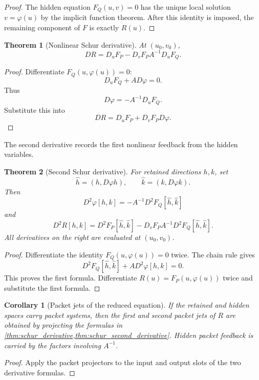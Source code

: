 \documentclass[11pt,a4paper]{article}
\newtheorem{theorem}{Theorem}[section]
\theoremstyle{plain}
\newtheorem{corollary}[corollary]{Corollary}
\theoremstyle{definition}
\theoremstyle{remark}
\begin{document}
\begin{proof}
The hidden equation $F_Q(u,v)=0$ has the unique local solution $v=\varphi(u)$ by the implicit function theorem.  After this identity is imposed, the remaining component of $F$ is exactly $R(u)$.
\end{proof}

\begin{theorem}[Nonlinear Schur derivative]\label{thm:schur_derivative}
At $(u_0,v_0)$,
\[
DR
=
D_uF_P
-
D_vF_P A^{-1}D_uF_Q.
\]
\end{theorem}

\begin{proof}
Differentiate $F_Q(u,\varphi(u))=0$:
\[
D_uF_Q+A D\varphi=0.
\]
Thus
\[
D\varphi=-A^{-1}D_uF_Q.
\]
Substitute this into
\[
DR=D_uF_P+D_vF_PD\varphi.
\]
\end{proof}

The second derivative records the first nonlinear feedback from the hidden variables.

\begin{theorem}[Second Schur derivative]\label{thm:schur_second_derivative}
For retained directions $h,k$, set
\[
\widehat h=(h,D\varphi h),
\qquad
\widehat k=(k,D\varphi k).
\]
Then
\[
D^2\varphi[h,k]
=
-A^{-1}D^2F_Q[\widehat h,\widehat k]
\]
and
\[
D^2R[h,k]
=
D^2F_P[\widehat h,\widehat k]
-
D_vF_P A^{-1}D^2F_Q[\widehat h,\widehat k].
\]
All derivatives on the right are evaluated at $(u_0,v_0)$.
\end{theorem}

\begin{proof}
Differentiate the identity $F_Q(u,\varphi(u))=0$ twice.  The chain rule gives
\[
D^2F_Q[\widehat h,\widehat k]
+A D^2\varphi[h,k]
=0.
\]
This proves the first formula.  Differentiate $R(u)=F_P(u,\varphi(u))$ twice and substitute the first formula.
\end{proof}

\begin{corollary}[Packet jets of the reduced equation]\label{cor:reduced_packet_jets}
If the retained and hidden spaces carry packet systems, then the first and second packet jets of $R$ are obtained by projecting the formulas in \cref{thm:schur_derivative,thm:schur_second_derivative}.  Hidden packet feedback is carried by the factors involving $A^{-1}$.
\end{corollary}

\begin{proof}
Apply the packet projectors to the input and output slots of the two derivative formulas.
\end{proof}
\end{document}

